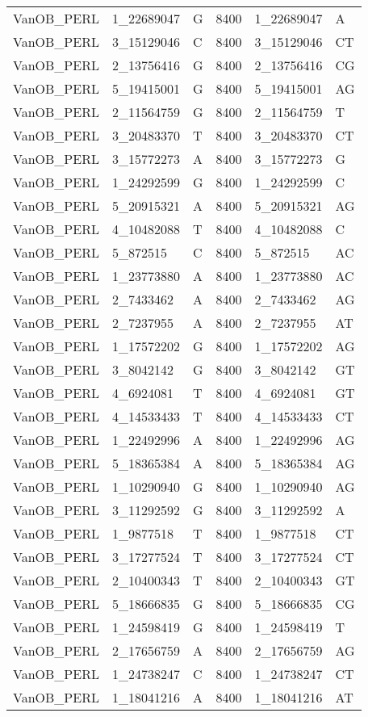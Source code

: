 \begin{center}
\begin{longtable}{|l|l|l|l|l|l|}
VanOB\_PERL&1\_22689047&G&8400&1\_22689047&A\\
VanOB\_PERL&3\_15129046&C&8400&3\_15129046&CT\\
VanOB\_PERL&2\_13756416&G&8400&2\_13756416&CG\\
VanOB\_PERL&5\_19415001&G&8400&5\_19415001&AG\\
VanOB\_PERL&2\_11564759&G&8400&2\_11564759&T\\
VanOB\_PERL&3\_20483370&T&8400&3\_20483370&CT\\
VanOB\_PERL&3\_15772273&A&8400&3\_15772273&G\\
VanOB\_PERL&1\_24292599&G&8400&1\_24292599&C\\
VanOB\_PERL&5\_20915321&A&8400&5\_20915321&AG\\
VanOB\_PERL&4\_10482088&T&8400&4\_10482088&C\\
VanOB\_PERL&5\_872515&C&8400&5\_872515&AC\\
VanOB\_PERL&1\_23773880&A&8400&1\_23773880&AC\\
VanOB\_PERL&2\_7433462&A&8400&2\_7433462&AG\\
VanOB\_PERL&2\_7237955&A&8400&2\_7237955&AT\\
VanOB\_PERL&1\_17572202&G&8400&1\_17572202&AG\\
VanOB\_PERL&3\_8042142&G&8400&3\_8042142&GT\\
VanOB\_PERL&4\_6924081&T&8400&4\_6924081&GT\\
VanOB\_PERL&4\_14533433&T&8400&4\_14533433&CT\\
VanOB\_PERL&1\_22492996&A&8400&1\_22492996&AG\\
VanOB\_PERL&5\_18365384&A&8400&5\_18365384&AG\\
VanOB\_PERL&1\_10290940&G&8400&1\_10290940&AG\\
VanOB\_PERL&3\_11292592&G&8400&3\_11292592&A\\
VanOB\_PERL&1\_9877518&T&8400&1\_9877518&CT\\
VanOB\_PERL&3\_17277524&T&8400&3\_17277524&CT\\
VanOB\_PERL&2\_10400343&T&8400&2\_10400343&GT\\
VanOB\_PERL&5\_18666835&G&8400&5\_18666835&CG\\
VanOB\_PERL&1\_24598419&G&8400&1\_24598419&T\\
VanOB\_PERL&2\_17656759&A&8400&2\_17656759&AG\\
VanOB\_PERL&1\_24738247&C&8400&1\_24738247&CT\\
VanOB\_PERL&1\_18041216&A&8400&1\_18041216&AT\\

\end{longtable}
\end{center}
